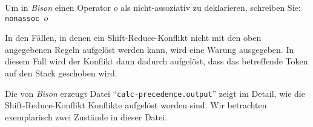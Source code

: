 \begin{enumerate}
\begin{enumerate}
            Um in \textsl{Bison} einen Operator $o$ als nicht-assoziativ zu deklarieren, 
            schreiben Sie:
            \\[0.2cm]
            \hspace*{1.3cm}
            \texttt{nonassoc $o$}
      \end{enumerate}
      In den F\"allen, in denen ein Shift-Reduce-Konflikt nicht mit den oben angegebenen Regeln aufgel\"ost
      werden kann, wird eine Warung ausgegeben.  In diesem Fall wird der Konflikt dann dadurch aufgel\"ost, 
      dass das betreffende Token auf den Stack geschoben wird.
\end{enumerate}
Die von \textsl{Bison} erzeugt Datei ``\texttt{calc-precedence.output}'' zeigt im Detail, wie die
Shift-Reduce-Konflikt Konflikte aufgel\"ost worden sind.  Wir betrachten exemplarisch zwei Zust\"ande in dieser
Datei.
